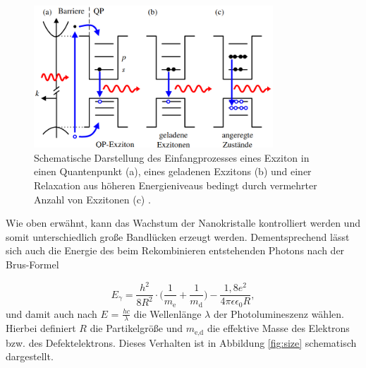 \begin{figure}[hbtp]
	\centering
	\includegraphics[width=0.8\textwidth]{Abb/photoqp.png}
	\caption{Schematische Darstellung des Einfangprozesses eines Exziton in einen
	Quantenpunkt (a), eines geladenen Exzitons (b) und einer Relaxation
	aus höheren Energieniveaus bedingt durch vermehrter Anzahl von Exzitonen (c) \cite{lars}.}
	\label{fig:photoqp}
\end{figure}
\noindent
Wie oben erwähnt, kann das Wachstum der Nanokristalle kontrolliert werden und
somit unterschiedlich große Bandlücken erzeugt werden. Dementsprechend lässt
sich auch die Energie des beim Rekombinieren entstehenden Photons nach der Brus-Formel

\begin{equation}
	E_{\gamma} = \frac{h^2}{8R^2}\cdot \biggl(\frac{1}{m_{\text{e}}} + \frac{1}{m_{\text{d}}} \biggr)
								- \frac{1,8e^2}{4\pi\epsilon\epsilon_0 R},
	\label{F1}
\end{equation}
\noindent
und damit auch nach $E$ = $\frac{hc}{\lambda}$ die Wellenlänge $\lambda$ der
Photolumineszenz wählen. Hierbei definiert $R$ die Partikelgröße und
$m_{\text{e,d}}$ die effektive Masse des Elektrons bzw. des Defektelektrons.
Dieses Verhalten ist in Abbildung \ref{fig:size} schematisch dargestellt.

